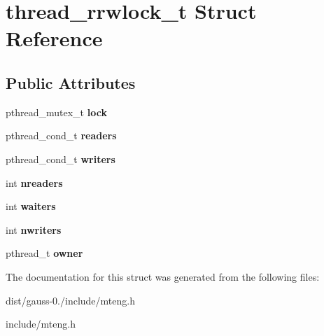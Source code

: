 \hypertarget{structthread__rrwlock__t}{\section{thread\-\_\-rrwlock\-\_\-t Struct Reference}
\label{structthread__rrwlock__t}
}
\subsection*{Public Attributes}
\begin{DoxyCompactItemize}
\item 
\hypertarget{structthread__rrwlock__t_a042fe97729a83ebe51c266f956864410}{pthread\-\_\-mutex\-\_\-t {\bfseries lock}}\label{structthread__rrwlock__t_a042fe97729a83ebe51c266f956864410}

\item 
\hypertarget{structthread__rrwlock__t_ac0992e67cd2e34f466c3482f19a7f59e}{pthread\-\_\-cond\-\_\-t {\bfseries readers}}\label{structthread__rrwlock__t_ac0992e67cd2e34f466c3482f19a7f59e}

\item 
\hypertarget{structthread__rrwlock__t_a529d8cebf3e89303454ac686fd8f1ee8}{pthread\-\_\-cond\-\_\-t {\bfseries writers}}\label{structthread__rrwlock__t_a529d8cebf3e89303454ac686fd8f1ee8}

\item 
\hypertarget{structthread__rrwlock__t_aca70d3e408060c696200669a518ba012}{int {\bfseries nreaders}}\label{structthread__rrwlock__t_aca70d3e408060c696200669a518ba012}

\item 
\hypertarget{structthread__rrwlock__t_acf9c9f4604a8d8c268190daf9b737eda}{int {\bfseries waiters}}\label{structthread__rrwlock__t_acf9c9f4604a8d8c268190daf9b737eda}

\item 
\hypertarget{structthread__rrwlock__t_aa16ca27021f8103909373a060777f32e}{int {\bfseries nwriters}}\label{structthread__rrwlock__t_aa16ca27021f8103909373a060777f32e}

\item 
\hypertarget{structthread__rrwlock__t_a539997dc5b514c7e61c8e7c08c1a9483}{pthread\-\_\-t {\bfseries owner}}\label{structthread__rrwlock__t_a539997dc5b514c7e61c8e7c08c1a9483}

\end{DoxyCompactItemize}


The documentation for this struct was generated from the following files\-:\begin{DoxyCompactItemize}
\item 
dist/gauss-\/0./include/mteng.\-h\item 
include/mteng.\-h\end{DoxyCompactItemize}
